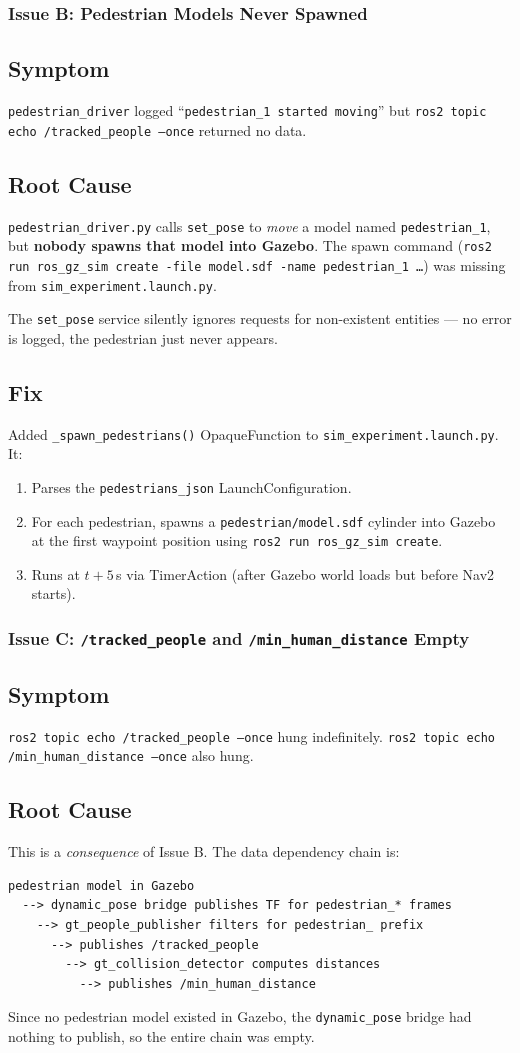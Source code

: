 \documentclass[11pt]{article}
\newcommand{\logentry}[1]{\subsection*{#1}}
\begin{document}
\subsubsection*{Issue B: Pedestrian Models Never Spawned}

\logentry{Symptom}
\texttt{pedestrian\_driver} logged ``\texttt{pedestrian\_1 started moving}'' but
\texttt{ros2 topic echo /tracked\_people --once} returned no data.

\logentry{Root Cause}
\texttt{pedestrian\_driver.py} calls \texttt{set\_pose} to \emph{move} a model
named \texttt{pedestrian\_1}, but \textbf{nobody spawns that model into Gazebo}.
The spawn command (\texttt{ros2 run ros\_gz\_sim create -file model.sdf -name
pedestrian\_1 \ldots}) was missing from \texttt{sim\_experiment.launch.py}.

The \texttt{set\_pose} service silently ignores requests for non-existent
entities --- no error is logged, the pedestrian just never appears.

\logentry{Fix}
Added \texttt{\_spawn\_pedestrians()} OpaqueFunction to
\texttt{sim\_experiment.launch.py}.  It:
\begin{enumerate}
  \item Parses the \texttt{pedestrians\_json} LaunchConfiguration.
  \item For each pedestrian, spawns a \texttt{pedestrian/model.sdf} cylinder
    into Gazebo at the first waypoint position using
    \texttt{ros2 run ros\_gz\_sim create}.
  \item Runs at $t+5$\,s via TimerAction (after Gazebo world loads but before
    Nav2 starts).
\end{enumerate}

\subsubsection*{Issue C: \texttt{/tracked\_people} and
  \texttt{/min\_human\_distance} Empty}

\logentry{Symptom}
\texttt{ros2 topic echo /tracked\_people --once} hung indefinitely.
\texttt{ros2 topic echo /min\_human\_distance --once} also hung.

\logentry{Root Cause}
This is a \emph{consequence} of Issue B.  The data dependency chain is:
\begin{verbatim}
pedestrian model in Gazebo
  --> dynamic_pose bridge publishes TF for pedestrian_* frames
    --> gt_people_publisher filters for pedestrian_ prefix
      --> publishes /tracked_people
        --> gt_collision_detector computes distances
          --> publishes /min_human_distance
\end{verbatim}
Since no pedestrian model existed in Gazebo, the \texttt{dynamic\_pose} bridge
had nothing to publish, so the entire chain was empty.
\end{document}
